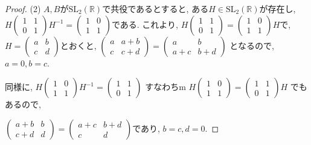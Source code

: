\begin{proof}
(2) $A,B$が$\mathrm{SL}_2(\mathbb{R})$で共役であるとすると,
ある$H \in \mathrm{SL}_2(\mathbb{R})$が存在し,
$H\begin{pmatrix}1&1\\0&1\end{pmatrix}H^{-1}=\begin{pmatrix}1&0\\1&1\end{pmatrix}$である.
これより,
$H\begin{pmatrix}1&1\\0&1\end{pmatrix}=\begin{pmatrix}1&0\\1&1\end{pmatrix}H$で,
$H=\begin{pmatrix} a&b\\c&d\end{pmatrix}$とおくと,
$\begin{pmatrix}a&a+b\\c&c+d\end{pmatrix}=\begin{pmatrix}a&b\\a+c&b+d\end{pmatrix}$
となるので,$a=0,b=c$.

同様に, $H\begin{pmatrix}1&0\\1&1\end{pmatrix}H^{-1}=\begin{pmatrix}1&1\\0&1\end{pmatrix}$
すなわちm $H\begin{pmatrix}1&0\\1&1\end{pmatrix}=\begin{pmatrix}1&1\\0&1\end{pmatrix}H$
でもあるので,

$\begin{pmatrix}a+b&b\\c+d&d\end{pmatrix}=\begin{pmatrix}a+c&b+d\\c&d\end{pmatrix}$であり,
$b=c,d=0$.


\end{proof}
